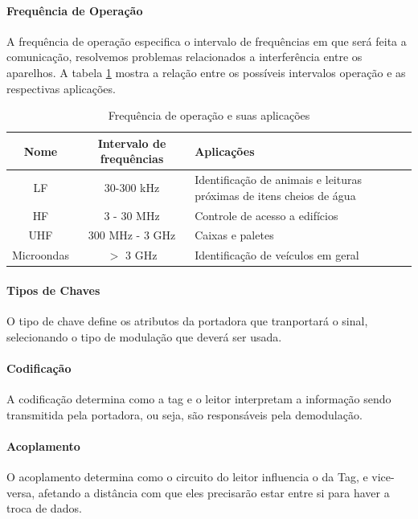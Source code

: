 \documentclass[a4paper,12pt,titlepage]{article}
\begin{document}
	\paragraph{Frequência de Operação} A frequência de operação especifica o intervalo de frequências em que será feita a comunicação, resolvemos problemas relacionados a interferência entre os aparelhos. A tabela \ref{tab:freqapp} mostra a relação entre os possíveis intervalos operação e as respectivas aplicações.

		\begin{table}
			\centering
			
			\begin{tabular}{|c|c|p{9cm}|}
				
				\hline Nome & Intervalo de frequências & Aplicações \\ 
				\hline LF & 30-300 kHz & Identificação de animais e leituras próximas de itens cheios de água \\ 
				\hline HF & 3 - 30 MHz & Controle de acesso a edifícios \\ 
				\hline UHF & 300 MHz - 3 GHz & Caixas e paletes \\ 
				\hline Microondas & $>$ 3 GHz & Identificação de veículos em geral \\ 
				\hline 
				
			\end{tabular} 	
			\caption{Frequência de operação e suas aplicações}
			\label{tab:freqapp}
		\end{table}	

	\paragraph{Tipos de Chaves} O tipo de chave define os atributos da portadora que tranportará o sinal, selecionando o tipo de modulação que deverá ser usada.
	
	\paragraph{Codificação} A codificação determina como a tag e o leitor interpretam a informação sendo transmitida pela portadora, ou seja, são responsáveis pela demodulação.
  
	\paragraph{Acoplamento} O acoplamento determina como o circuito do leitor influencia o da Tag, e vice-versa, afetando a distância com que eles precisarão estar entre si para haver a troca de dados.\\
	 
\end{document}
